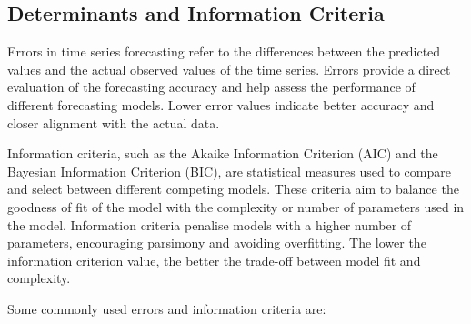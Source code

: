 \documentclass[
]{article}
\begin{document}
\hypertarget{determinants-and-information-criteria}{%
\subsection{Determinants and Information
Criteria}\label{determinants-and-information-criteria}}

Errors in time series forecasting refer to the differences between the
predicted values and the actual observed values of the time series.
Errors provide a direct evaluation of the forecasting accuracy and help
assess the performance of different forecasting models. Lower error
values indicate better accuracy and closer alignment with the actual
data.

Information criteria, such as the Akaike Information Criterion (AIC) and
the Bayesian Information Criterion (BIC), are statistical measures used
to compare and select between different competing models. These criteria
aim to balance the goodness of fit of the model with the complexity or
number of parameters used in the model. Information criteria penalise
models with a higher number of parameters, encouraging parsimony and
avoiding overfitting. The lower the information criterion value, the
better the trade-off between model fit and complexity.

Some commonly used errors and information criteria are:
\end{document}
